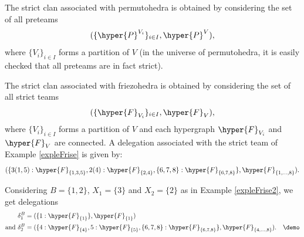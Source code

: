\begin{example} \label{delegPermuto}
The strict clan associated with permutohedra is obtained by considering the set of all  preteams $$(\{\hyper{P}^{V_i}\}_{i \in I}, \hyper{P}^V),$$ where $\{V_i\}_{i \in I}$ forms a partition of $V$ (in the universe of permutohedra, it is easily checked that all preteams are in fact strict).\demo
\end{example}
 
 
\begin{example} \label{expleFriseClan}
The strict clan associated with friezohedra is obtained by considering the set of all strict teams $$(\{\hyper{F}_{V_i}\}_{i \in I}, \hyper{F}_V),$$ where $\{V_i\}_{i \in I}$ forms a partition of $V$ and each hypergraph $\hyper{F}_{V_i}$ and $\hyper{F}_{V}$  are connected. A delegation associated with the strict team of Example \ref{expleFrise} is given by:
$$(\{3(1,5) : \hyper{F}_{\{1,3,5\}},2(4) : \hyper{F}_{\{2,4\}} ,\{6,7,8\} : \hyper{F}_{\{6,7,8\}}\}, \hyper{F}_{\{1,\ldots,8\}}) .$$

 Considering $B=\{1,2\}$, $X_1= \{3\}$ and $X_2= \{2\}$ as in Example \ref{expleFrise2}, we get delegations 
\begin{align*}
\delta_1^B&=(\{1 : \hyper{F}_{\{1\}}\}, \hyper{F}_{\{1\}}) \\
\text{and } \delta_2^B&=(\{ 4 : \hyper{F}_{\{4\}}, 5 : \hyper{F}_{\{5\}}, \{6,7,8\} : \hyper{F}_{\{6,7,8\}}\}, \hyper{F}_{\{4,\ldots, 8\}}) . \quad \demo
\end{align*} 

\end{example}

